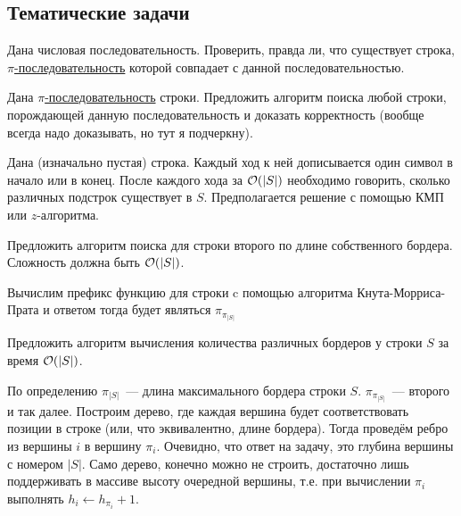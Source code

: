 \documentclass[addpoints]{exam}
\begin{document}
\begin{questions}

\section{Тематические задачи}

\question[\half] \label{check_pi} Дана числовая последовательность. Проверить, правда ли, что существует строка, \hyperref[piseq]{$\pi$-последовательность} которой совпадает с данной последовательностью.  

\question[\half] \label{inverse_pi} Дана \hyperref[piseq]{$\pi$-последовательность} строки. Предложить алгоритм поиска любой строки, порождающей данную последовательность и доказать корректность (вообще всегда надо доказывать, но тут я подчеркну).

\question[\half] Дана (изначально пустая) строка. Каждый ход к ней дописывается один символ в начало или в конец. После каждого хода за $\mathcal{O}(|S|)$ необходимо говорить, сколько различных подстрок существует в $S$. Предполагается решение с помощью КМП или $z$-алгоритма.

\question[\half] Предложить алгоритм поиска для строки второго по длине собственного бордера. Сложность должна быть $\mathcal{O}(|S|)$.

\begin{solution}

Вычислим префикс функцию для строки c помощью алгоритма Кнута-Морриса-Прата и ответом тогда будет являться $\pi_{\pi_{|S|}}$

\end{solution}

\question[\half] Предложить алгоритм вычисления количества различных бордеров у строки $S$ за время $\mathcal{O}(|S|)$. 

\begin{solution}

По определению $\pi_{|S|}$~--- длина максимального бордера строки $S$. $\pi_{\pi_{|S|}}$~--- второго и так далее. Построим дерево, где каждая вершина будет соответствовать позиции в строке (или, что эквивалентно, длине бордера). Тогда проведём ребро из вершины $i$ в вершину $\pi_{i}$. Очевидно, что ответ на задачу, это глубина вершины с номером $|S|$. Само дерево, конечно можно не строить, достаточно лишь поддерживать в массиве высоту очередной вершины, т.е. при вычислении $\pi_i$ выполнять $h_i \leftarrow h_{\pi_i} + 1$.

\end{solution}


\end{questions}
\end{document}
